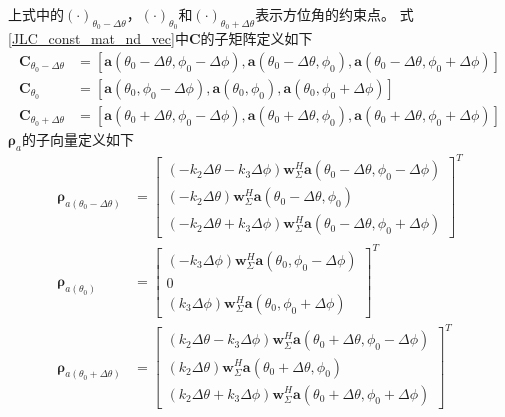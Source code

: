 \documentclass[master]{thesis-uestc}
\begin{document}
上式中的$(\cdot)_{\theta_0-\Delta\theta}$，$(\cdot)_{\theta_0}$和$(\cdot)_{\theta_0+\Delta\theta}$表示方位角的约束点。
式\eqref{JLC_const_mat_nd_vec}中$\bm{C}$的子矩阵定义如下
\begin{subequations}\label{JLC_sub_cons_mat}
    \begin{align}
        \bm{C}_{\theta_0-\Delta\theta} &= 
        \left[
            \bm{a}(\theta_0-\Delta\theta,\phi_0-\Delta\phi),\bm{a}(\theta_0-\Delta\theta,\phi_0),
            \bm{a}(\theta_0-\Delta\theta,\phi_0+\Delta\phi)
        \right] \\
        \bm{C}_{\theta_0} &= 
        \left[
            \bm{a}(\theta_0,\phi_0-\Delta\phi),\bm{a}(\theta_0,\phi_0),\bm{a}(\theta_0,\phi_0+\Delta\phi)
        \right] \\
        \bm{C}_{\theta_0+\Delta\theta} &= 
        \left[
            \bm{a}(\theta_0+\Delta\theta,\phi_0-\Delta\phi),\bm{a}(\theta_0+\Delta\theta,\phi_0),
            \bm{a}(\theta_0+\Delta\theta,\phi_0+\Delta\phi)
        \right]
    \end{align}
\end{subequations}
$\bm{\rho}_a$的子向量定义如下
\begin{subequations}\label{JLC_sub_cons_vec_a}
    \begin{align}
        \bm{\rho}_{a(\theta_0-\Delta\theta)} &= 
        \begin{bmatrix}
            (-k_2\Delta\theta-k_3\Delta\phi)\bm{w}^H_\Sigma\bm{a}(\theta_0-\Delta\theta,\phi_0-\Delta\phi) \\
            (-k_2\Delta\theta)\bm{w}^H_\Sigma\bm{a}(\theta_0-\Delta\theta,\phi_0) \\
            (-k_2\Delta\theta+k_3\Delta\phi)\bm{w}^H_\Sigma\bm{a}(\theta_0-\Delta\theta,\phi_0+\Delta\phi)
        \end{bmatrix}^T \\
        \bm{\rho}_{a(\theta_0)} &= 
        \begin{bmatrix}
            (-k_3\Delta\phi)\bm{w}^H_\Sigma\bm{a}(\theta_0,\phi_0-\Delta\phi) \\
            0 \\
            (k_3\Delta\phi)\bm{w}^H_\Sigma\bm{a}(\theta_0,\phi_0+\Delta\phi)
        \end{bmatrix}^T \\
        \bm{\rho}_{a(\theta_0+\Delta\theta)} &= 
        \begin{bmatrix}
            (k_2\Delta\theta-k_3\Delta\phi)\bm{w}^H_\Sigma\bm{a}(\theta_0+\Delta\theta,\phi_0-\Delta\phi) \\
            (k_2\Delta\theta)\bm{w}^H_\Sigma\bm{a}(\theta_0+\Delta\theta,\phi_0) \\
            (k_2\Delta\theta+k_3\Delta\phi)\bm{w}^H_\Sigma\bm{a}(\theta_0+\Delta\theta,\phi_0+\Delta\phi)
        \end{bmatrix}^T
    \end{align}
\end{subequations}
\end{document}
